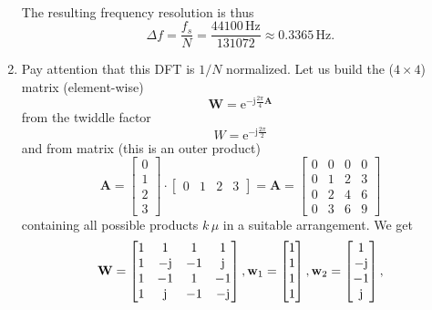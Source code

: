\documentclass[11pt,a4paper,DIV=12]{scrartcl}
\begin{document}
\begin{Loesung}
\begin{enumerate}[label=\alph*)]
\begin{align}
	\end{align}
	The resulting frequency resolution is thus
	\begin{equation}
	\Delta f=\frac{f_s}{N}=\frac{44100\,\text{Hz}}{131072}\approx0.3365\,\text{Hz}.\nonumber
	\end{equation}
	\item
	Pay attention that this DFT is $1/N$ normalized.
	Let us build the ($4\times 4$) matrix (element-wise)
	\begin{equation}
	\mathbf{W} = \mathrm{e}^{-\mathrm{j}\frac{2\pi}{4} \mathbf{A}}
	\end{equation}
	from the twiddle factor
	\begin{equation}
	W = \mathrm{e}^{-\mathrm{j}\frac{2\pi}{2}}
	\end{equation}
	and from matrix (this is an outer product)
	\begin{equation}
	\mathbf{A} =
	\begin{bmatrix}
	0\\
	1\\
	2\\
	3
	\end{bmatrix}
	\cdot
	\begin{bmatrix}
	0 & 1 & 2 & 3
	\end{bmatrix}
	=
	\mathbf{A} =
	\begin{bmatrix}
	0 & 0 & 0 & 0\\
	0 & 1 & 2 & 3\\
	0 & 2 & 4 & 6\\
	0 & 3 & 6 & 9
	\end{bmatrix}
	\end{equation}
	containing all possible products $k\,\mu$ in a suitable arrangement.
	We get
	\begin{align}
	\mathbf{W} = \begin{bmatrix}
	1 & 1 & 1 & 1\\
	1 & -\mathrm{j} & -1 & \mathrm{j}\\
	1 & -1 & 1 & -1\\
	1 & \mathrm{j} & -1 & -\mathrm{j}
	\end{bmatrix},
	\mathbf{w}_1 = \begin{bmatrix}1\\1\\1\\1\end{bmatrix},
	\mathbf{w}_2 = \begin{bmatrix}1\\-\im\\-1\\\im\end{bmatrix},

\end{align}
\end{enumerate}
\end{Loesung}
\end{document}

